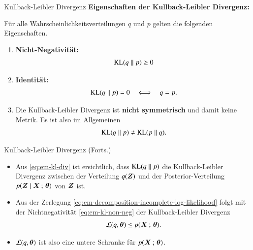 \begin{frame}{Kullback-Leibler Divergenz}{}
	\textbf{Eigenschaften der Kullback-Leibler Divergenz:}
	
	\begin{boxGray}
		Für alle Wahrscheinlichkeitsverteilungen $q$ und $p$ gelten die folgenden Eigenschaften.

		\begin{enumerate}
			\item \textbf{Nicht-Negativität:}
			\begin{equation} \label{eq:em-kl-non-neg}
				\text{KL}(q \parallel p) \ge 0
			\end{equation}
			\item \textbf{Identität:}
			\begin{equation} \label{eq:em-kl-ident}
				\text{KL}(q \parallel p) = 0 \quad\Longleftrightarrow\quad q = p.
			\end{equation}
			\item Die Kullback-Leibler Divergenz ist \textbf{nicht symmetrisch} und damit keine Metrik. Es ist also im Allgemeinen
			\begin{equation*}
				\text{KL}(q \parallel p) \ne \text{KL}(p \parallel q).
			\end{equation*}
		\end{enumerate}
	\end{boxGray}
\end{frame}


\begin{frame}{Kullback-Leibler Divergenz (Forts.)}{}
	\begin{itemize}
		\item Aus \eqref{eq:em-kl-div} ist ersichtlich, dass $\text{KL}(q \parallel p)$ die Kullback-Leibler Divergenz zwischen
			der Verteilung $q(\bm{Z})$ und der Posterior-Verteilung $p(\bm{Z} \mid \bm{X} \,;\, \bm{\theta})$ von $\bm{Z}$ ist.
		\item Aus der Zerlegung \eqref{eq:em-decomposition-incomplete-log-likelihood} folgt mit der Nichtnegativität \eqref{eq:em-kl-non-neg}
			der Kullback-Leibler Divergenz
		\begin{equation*}
			\mathcal{L}(q, \bm{\theta}) \le p(\bm{X} \,;\, \bm{\theta}).
		\end{equation*}
		\item $\mathcal{L}(q, \bm{\theta})$ ist also eine untere Schranke für $p(\bm{X} \,;\, \bm{\theta})$.
	\end{itemize}
\end{frame}


